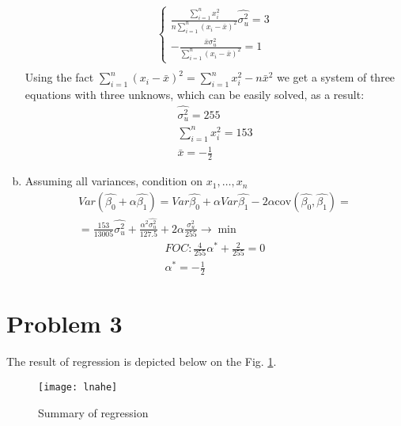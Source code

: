 \documentclass[a4paper]{article}
\newcommand{\summa}{\sum_{i=1}^n}
\begin{document}
\begin{enumerate}[(a)]
\begin{align*}
\begin{cases}
	\frac{\summa x_i^2}{n\summa(x_i - \bar{x})^2}\hat{\sigma_u^2} = 3\\
	-\frac{\bar{x} \sigma^2_u}{\summa (x_i - \bar{x})^2} = 1
	\end{cases}\\
	\end{align*}
	Using the fact $\summa (x_i - \bar{x})^2 = \summa x_i^2 - n\bar{x}^2$ we get a system of three equations with three unknows, which can be easily solved, as a result:
	\begin{align*}
	\hat{\sigma^2_u} = 255\\
	\summa x_i^2 = 153\\
	\bar{x} = -\frac{1}{2}
	\end{align*}
	\item Assuming all variances, condition on $x_1, \dots, x_n$
	\begin{align*}
	Var(\hat{\beta_0} + \alpha \hat{\beta_1}) = Var\hat{\beta_0} + \alpha Var \hat{\beta_1} -2\alpha \text{cov}(\hat{\beta_0}, \hat{\beta_1}) =\\
	=\frac{153}{13005}\hat{\sigma_u^2} + \frac{\alpha^2 \hat{\sigma^2_u}}{127.5} + 2\alpha \frac{ \sigma^2_u}{255} \to \min
	\end{align*}
	\begin{align*}
	FOC: \frac{4}{255} \alpha^* + \frac{2}{255} = 0\\
	\alpha^* = -\frac{1}{2}
	\end{align*}
\end{enumerate}
\section*{Problem 3}
The result of regression is depicted below on the Fig. \ref{fig1}.


\begin{figure}[h]
	\centering
	\texttt{[image: lnahe]}
	\caption{Summary of regression}\label{fig1}
\end{figure}
\end{document}
